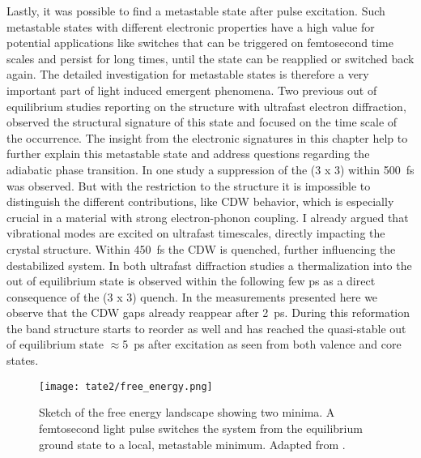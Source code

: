 Lastly, it was possible to find a metastable state after pulse excitation.
Such metastable states with different electronic properties have a high value for potential applications like switches that can be triggered on femtosecond time scales and persist for long times, until the state can be reapplied or switched back again.
The detailed investigation for metastable states is therefore a very important part of light induced emergent phenomena.
Two previous out of equilibrium studies reporting on the structure with ultrafast electron diffraction, observed the structural signature of this state and focused on the time scale of the occurrence.
The insight from the electronic signatures in this chapter help to further explain this metastable state and address questions regarding the adiabatic phase transition.
In one study \cite{domrose_femtosecond_2024} a suppression of the (3 x 3) within \qty{500}{\femto\second} was observed.
But with the restriction to the structure it is impossible to distinguish the different contributions, like CDW behavior, which is especially crucial in a material with strong electron-phonon coupling.
I already argued that vibrational modes are excited on ultrafast timescales, directly impacting the crystal structure.
Within \qty{450}{\femto\second} the CDW is quenched, further influencing the destabilized system.
In both ultrafast diffraction studies a thermalization into the out of equilibrium state is observed within the following few \unit{\pico\second} as a direct consequence of the (3 x 3) quench.
In the measurements presented here we observe that the CDW gaps already reappear after \qty{2}{\pico\second}.
During this reformation the band structure starts to reorder as well and has reached the quasi-stable out of equilibrium state $\approx$\qty{5}{\pico\second} after excitation as seen from both valence and core states.

\begin{figure}
	\centering
	\texttt{[image: tate2/free\_energy.png]}
	\caption{Sketch of the free energy landscape showing two minima. A femtosecond light pulse switches the system from the equilibrium ground state to a local, metastable minimum. Adapted from \cite{basov_towards_2017}.}
	\label{fig:free_energy}
\end{figure}


